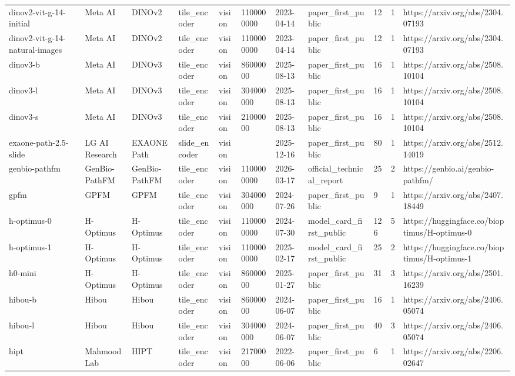\begin{longtable}{lllllllllll}
dinov2-vit-g-14-initial & Meta AI & DINOv2 & tile\_encoder & vision & 1100000000 & 2023-04-14 & paper\_first\_public & 12 & 1 & https://arxiv.org/abs/2304.07193 \\
dinov2-vit-g-14-natural-images & Meta AI & DINOv2 & tile\_encoder & vision & 1100000000 & 2023-04-14 & paper\_first\_public & 12 & 1 & https://arxiv.org/abs/2304.07193 \\
dinov3-b & Meta AI & DINOv3 & tile\_encoder & vision & 86000000 & 2025-08-13 & paper\_first\_public & 16 & 1 & https://arxiv.org/abs/2508.10104 \\
dinov3-l & Meta AI & DINOv3 & tile\_encoder & vision & 304000000 & 2025-08-13 & paper\_first\_public & 16 & 1 & https://arxiv.org/abs/2508.10104 \\
dinov3-s & Meta AI & DINOv3 & tile\_encoder & vision & 21000000 & 2025-08-13 & paper\_first\_public & 16 & 1 & https://arxiv.org/abs/2508.10104 \\
exaone-path-2.5-slide & LG AI Research & EXAONE Path & slide\_encoder & vision &  & 2025-12-16 & paper\_first\_public & 80 & 1 & https://arxiv.org/abs/2512.14019 \\
genbio-pathfm & GenBio-PathFM & GenBio-PathFM & tile\_encoder & vision & 1100000000 & 2026-03-17 & official\_technical\_report & 25 & 2 & https://genbio.ai/genbio-pathfm/ \\
gpfm & GPFM & GPFM & tile\_encoder & vision & 304000000 & 2024-07-26 & paper\_first\_public & 9 & 1 & https://arxiv.org/abs/2407.18449 \\
h-optimus-0 & H-Optimus & H-Optimus & tile\_encoder & vision & 1100000000 & 2024-07-30 & model\_card\_first\_public & 126 & 5 & https://huggingface.co/bioptimus/H-optimus-0 \\
h-optimus-1 & H-Optimus & H-Optimus & tile\_encoder & vision & 1100000000 & 2025-02-17 & model\_card\_first\_public & 25 & 2 & https://huggingface.co/bioptimus/H-optimus-1 \\
h0-mini & H-Optimus & H-Optimus & tile\_encoder & vision & 86000000 & 2025-01-27 & paper\_first\_public & 31 & 3 & https://arxiv.org/abs/2501.16239 \\
hibou-b & Hibou & Hibou & tile\_encoder & vision & 86000000 & 2024-06-07 & paper\_first\_public & 16 & 1 & https://arxiv.org/abs/2406.05074 \\
hibou-l & Hibou & Hibou & tile\_encoder & vision & 304000000 & 2024-06-07 & paper\_first\_public & 40 & 3 & https://arxiv.org/abs/2406.05074 \\
hipt & MahmoodLab & HIPT & tile\_encoder & vision & 21700000 & 2022-06-06 & paper\_first\_public & 6 & 1 & https://arxiv.org/abs/2206.02647 \\

\end{longtable}
